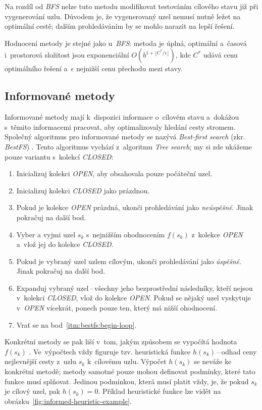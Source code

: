 Na rozdíl od \emph{BFS} nelze tuto metodu modifikovat testováním cílového stavu již při vygenerování uzlu. Důvodem je, že vygenerovaný uzel nemusí nutně ležet na optimální cestě; dalším prohledáváním by se mohlo narazit na lepší řešení.

Hodnocení metody je stejné jako u~\emph{BFS}: metoda je úplná, optimální a~časová i~prostorová složitost jsou exponenciální $O(b^{1 + \lfloor C^* / \epsilon \rfloor})$, kde $C^*$ udává cenu optimálního řešení a~$\epsilon$ nejnižší cenu přechodu mezi stavy.

\subsection*{Informované metody}

Informované metody mají k~dispozici informace o~cílovém stavu a~dokážou s~těmito informacemi pracovat, aby optimalizovaly hledání cesty stromem. Společný algoritmus pro informované metody se nazývá \emph{Best-first search} (zkr. \emph{BestFS}) \cite{AI_Russel_Norvig}. Tento algoritmus vychází z~algoritmu \emph{Tree search}; my si zde ukážeme pouze variantu s~kolekcí \emph{CLOSED}:
\begin{enumerate}
    \item Inicializuj kolekci \emph{OPEN}, aby obsahovala pouze počáteční uzel.
    \item Inicializuj kolekci \emph{CLOSED} jako prázdnou.
    \item \label{itm:bestfs:begin-loop} Pokud je kolekce \emph{OPEN} prázdná, ukonči prohledávání jako \emph{neúspěšné}. Jinak pokračuj na další bod.
    \item Vyber a vyjmi uzel ${s_k}$ s~nejnižším ohodnocením $f(s_k)$ z~kolekce \emph{OPEN} a~vlož jej do kolekce \emph{CLOSED}.
    \item Pokud je vybraný uzel uzlem cílovým, ukonči prohledávání jako \emph{úspěšné}. Jinak pokračuj na další bod.
    \item Expanduj vybraný uzel\,--\,všechny jeho bezprostřední následníky, kteří nejsou v~kolekci \emph{CLOSED}, vlož do kolekce \emph{OPEN}. Pokud se nějaký uzel vyskytuje v~\emph{OPEN} vícekrát, ponech pouze ten, který má nižší ohodnocení.
    \item Vrať se na bod~\ref{itm:bestfs:begin-loop}.
\end{enumerate}

Konkrétní metody se pak liší v~tom, jakým způsobem se vypočítá hodnota ${f(s_k)}$ \cite{AI_Russel_Norvig}. Ve~výpočtech vždy figuruje tzv. heuristická funkce ${h(s_k)}$\,--\,odhad ceny nejlevnější cesty z~uzlu ${s_k}$ k~cílovému uzlu. Výpočet ${h(s_k)}$ se neváže ke konkrétní metodě; metody samotné pouze mohou definovat podmínky, které tato funkce musí splňovat. Jedinou podmínkou, která musí platit vždy, je, že pokud $s_k$ je cílový uzel, pak ${h(s_k) = 0}$. Příklad heuristické funkce lze vidět na obrázku~\ref{fig:informed-heuristic-example}.

